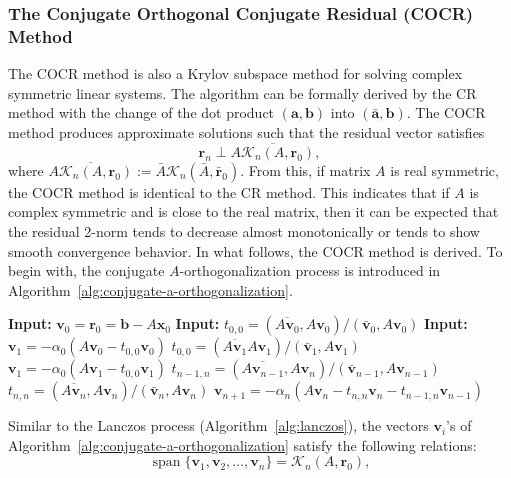 \subsubsection{{The Conjugate Orthogonal Conjugate Residual (COCR) Method}}\label{subsec:cocr-method}
{The COCR method  is also a Krylov subspace method for solving complex symmetric linear systems. The algorithm can be formally derived by the CR method with the change of the dot product $(\bm a,\bm b)$ into $(\bar{\bm a},\bm b)$. The COCR method produces approximate solutions such that the residual vector satisfies}
\[\bm r_n\perp\overline{A\mathcal K_n(A,\bm r_0)},\]
{where $\overline{A\mathcal K_n(A,\bm r_0)}:=\bar A\mathcal K_n(\bar A,\bar{\bm r}_0)$. From this, if matrix $A$ is real symmetric, the COCR method is identical to the CR method. This indicates that if $A$ is complex symmetric and is close to the real matrix, then it can be expected that the residual 2-norm tends to decrease almost monotonically or tends to show smooth convergence behavior. In what follows, the COCR method is derived. To begin with, the conjugate $A$-orthogonalization process is introduced in Algorithm\ \ref{alg:conjugate-a-orthogonalization}.}
\begin{algorithm}[H]\caption{{The conjugate $A$-orthogonalization process without normalization (note: $(\bar{\bm a},\bm b)=\bm a^{\top}\bm b$)}}\label{alg:conjugate-a-orthogonalization}\begin{algorithmic}[1]
\Statex\textbf{Input:} $\bm v_0=\bm r_0=\bm b-A\bm x_0$
\Statex\textbf{Input:} $t_{0,0}=(\overline{A\bm v_0},A\bm v_0)/(\bar{\bm v}_0,A\bm v_0)$
\Statex\textbf{Input:} $\bm v_1=-\alpha_0(A\bm v_0-t_{0,0}\bm v_0)$
\State $t_{0,0}=(\overline{A\bm v_1}A\bm v_1)/(\bar{\bm v}_1,A\bm v_1)$
\State $\bm v_1=-\alpha_0(A\bm v_1-t_{0,0}\bm v_1)$
\State $t_{n-1,n}=(\overline{A\bm v_{n-1}},A\bm v_n)/(\bar{\bm v}_{n-1},A\bm v_{n-1})$
\State $t_{n,n}=(\overline{A\bm v_n},A\bm v_n)/(\bar{\bm v}_n,A\bm v_n)$
\State $\bm v_{n+1}=-\alpha_n(A\bm v_n-t_{n,n}\bm v_n-t_{n-1,n}\bm v_{n-1})$
\EndFor\end{algorithmic}\end{algorithm}
{Similar to the Lanczos process (Algorithm\ \ref{alg:lanczos}), the vectors $\bm v_i$'s of Algorithm\ \ref{alg:conjugate-a-orthogonalization} satisfy the following relations:}
\[\operatorname{span}\{\bm v_1,\bm v_2,\ldots,\bm v_n\}=\mathcal K_n(A,\bm r_0),\]
